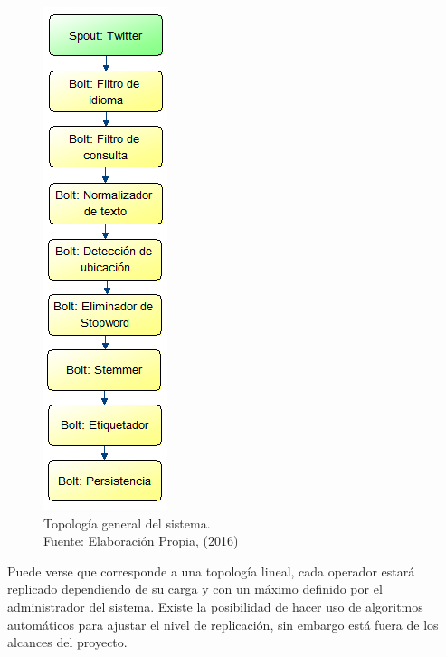 \begin{figure}[H]
	\centering
	\captionsetup{justification=centering}
	\includegraphics[scale=0.8]{images/TopologiaGeneral.png}
	\caption[Topología general del sistema.]{Topología general del sistema.\\Fuente: Elaboración Propia, (2016)}
	\label{fig:TopologiaGeneral}
\end{figure}

Puede verse que corresponde a una topología lineal, cada operador estará replicado dependiendo de su carga y con un máximo definido por el administrador del sistema. Existe la posibilidad de hacer uso de algoritmos automáticos para ajustar el nivel de replicación, sin embargo está fuera de los alcances del proyecto.





